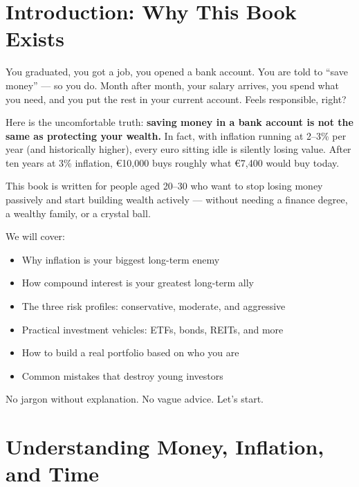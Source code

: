 \documentclass[12pt, a4paper]{book}
\begin{document}
\tableofcontents
\thispagestyle{empty}

\chapter*{Introduction: Why This Book Exists}

You graduated, you got a job, you opened a bank account. You are told to ``save money'' --- so you do. Month after month, your salary arrives, you spend what you need, and you put the rest in your current account. Feels responsible, right?

Here is the uncomfortable truth: \textbf{saving money in a bank account is not the same as protecting your wealth.} In fact, with inflation running at 2--3\% per year (and historically higher), every euro sitting idle is silently losing value. After ten years at 3\% inflation, \euro{}10{,}000 buys roughly what \euro{}7{,}400 would buy today.

This book is written for people aged 20--30 who want to stop losing money passively and start building wealth actively --- without needing a finance degree, a wealthy family, or a crystal ball.

We will cover:
\begin{itemize}[leftmargin=1.5cm]
  \item Why inflation is your biggest long-term enemy
  \item How compound interest is your greatest long-term ally
  \item The three risk profiles: conservative, moderate, and aggressive
  \item Practical investment vehicles: ETFs, bonds, REITs, and more
  \item How to build a real portfolio based on who you are
  \item Common mistakes that destroy young investors
\end{itemize}

No jargon without explanation. No vague advice. Let's start.

\chapter{Understanding Money, Inflation, and Time}
\end{document}
